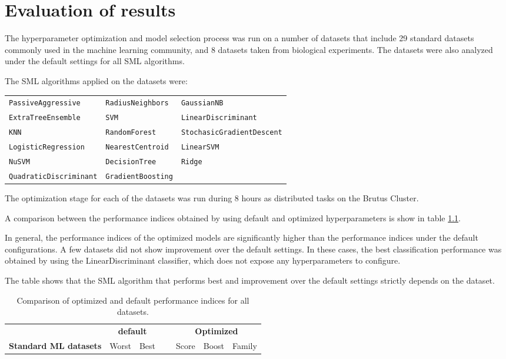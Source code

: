 \chapter{Evaluation of results}


The hyperparameter optimization and model selection process was run on a number of datasets that
include 29 standard datasets commonly used in the machine learning community, and 8 datasets taken from
biological experiments. The datasets were also analyzed under the default settings for all SML
algorithms.

The SML algorithms applied on the datasets were:

\begin{tabularx}{\textwidth}{l l l}
\texttt{PassiveAggressive} &
\texttt{RadiusNeighbors} &
\texttt{GaussianNB} \\
\texttt{ExtraTreeEnsemble} &
\texttt{SVM} &
\texttt{LinearDiscriminant} \\
\texttt{KNN} &
\texttt{RandomForest} &
\texttt{StochasicGradientDescent} \\
\texttt{LogisticRegression} &
\texttt{NearestCentroid} & 
\texttt{LinearSVM}\\
\texttt{NuSVM} &
\texttt{DecisionTree} &
\texttt{Ridge} \\
\texttt{QuadraticDiscriminant} &
\texttt{GradientBoosting} &
\end{tabularx}


The optimization stage for each of the datasets was run during 8 hours as distributed tasks on the
Brutus Cluster.

A comparison between the performance indices obtained by using default and optimized hyperparameters
is show in table \ref{tb:comparison_all}.

In general, the performance indices of the optimized models are significantly higher than the
performance indices under the default configurations. A few datasets did not show improvement over
the default settings. In these cases, the best classification performance was obtained by using the
LinearDiscriminant classifier, which does not expose any hyperparameters to configure.

The table shows that the SML algorithm that performs best and improvement over the default settings
strictly depends on the dataset.

\begin{table}[h!]
\centering
\begin{tabularx}{\textwidth}{l r r r r r l}
	& \multicolumn{2}{c}{\bf default} & ~ & \multicolumn{3}{c}{\bf Optimized}\\
	\cline{2-3}
	\cline{5-7}
{\bf Standard ML datasets} & Worst & Best & ~ & Score & Boost & Family\\
	\cline{1-7}
	
\end{tabularx}
\caption{Comparison of optimized and default performance indices for all datasets.}
\label{tb:comparison_all}
\end{table}

